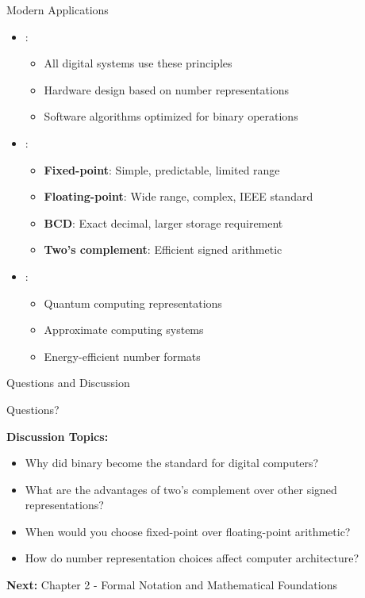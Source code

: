 \begin{frame}{Modern Applications}
\begin{itemize}
\item {}:
\begin{itemize}
\item All digital systems use these principles
\item Hardware design based on number representations
\item Software algorithms optimized for binary operations
\end{itemize}
\vspace{0.3cm}
\item {}:
\begin{itemize}
\item \textbf{Fixed-point}: Simple, predictable, limited range
\item \textbf{Floating-point}: Wide range, complex, IEEE standard
\item \textbf{BCD}: Exact decimal, larger storage requirement
\item \textbf{Two's complement}: Efficient signed arithmetic
\end{itemize}
\vspace{0.3cm}
\item {}:
\begin{itemize}
\item Quantum computing representations
\item Approximate computing systems
\item Energy-efficient number formats
\end{itemize}
\end{itemize}
\end{frame}

\begin{frame}{Questions and Discussion}
\begin{center}
\Large
Questions?

\vspace{1cm}

\normalsize
\textbf{Discussion Topics:}
\begin{itemize}
\item Why did binary become the standard for digital computers?
\item What are the advantages of two's complement over other signed representations?
\item When would you choose fixed-point over floating-point arithmetic?
\item How do number representation choices affect computer architecture?
\end{itemize}

\vspace{0.5cm}
\textbf{Next:} Chapter 2 - Formal Notation and Mathematical Foundations
\end{center}
\end{frame}


